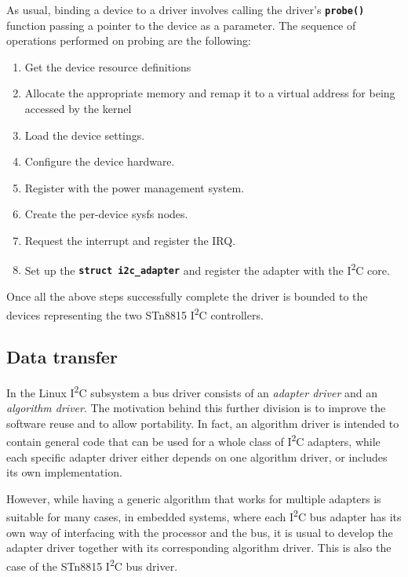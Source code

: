 \documentclass[a4paper,10pt]{article}
\newenvironment{packedenum}{
\begin{enumerate}
  \setlength{\itemsep}{3pt}
  \setlength{\parskip}{0pt}
  \setlength{\parsep}{0pt}
}{\end{enumerate}}
\newcommand{\icc}{I\textsuperscript{2}C }
\newcommand{\keyword}[1]{\texttt{\textbf{#1}}}
\begin{document}
\begin{multicols}{2}
As usual, binding a device to a driver involves calling the driver's 
\keyword{probe()} function passing a pointer to the device as a parameter.
The sequence of operations performed on probing are the following:
\begin{packedenum}
	\item Get the device resource definitions
	\item Allocate the appropriate memory and remap it to a virtual address
		for being accessed by the kernel
	\item Load the device settings.
	\item Configure the device hardware.
	\item Register with the power management system.
	\item Create the per-device sysfs nodes.
	\item Request the interrupt and	register the IRQ.
	\item Set up the \keyword{struct i2c\_adapter} and register the adapter
		with the \icc core.
\end{packedenum}

Once all the above steps successfully complete the driver is bounded to the
devices representing the two STn8815 \icc controllers.


\subsection{Data transfer}
\label{sec:adapter_data_transfer}

In the Linux \icc subsystem a bus driver consists of an \emph{adapter driver}
and an \emph{algorithm driver}. The motivation behind this further division is
to improve the software reuse and to allow portability. In fact, an algorithm
driver is intended to contain general code that can be used for a whole class
of \icc adapters, while each specific adapter driver either depends on one
algorithm driver, or includes its own implementation.

However, while having a generic algorithm that works for multiple adapters is
suitable for many cases, in embedded systems, where each \icc bus
adapter has its own way of interfacing with the processor and the bus,
it is usual to develop the adapter driver together with its corresponding
algorithm driver. This is also the case of the STn8815 \icc bus driver.


\end{multicols}
\end{document}

